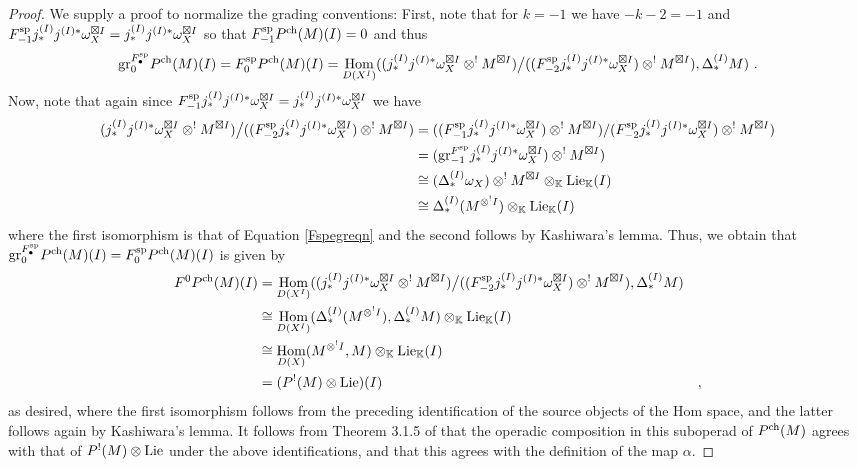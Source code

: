 \documentclass[11pt]{amsart}
\numberwithin{equation}{section}
\theoremstyle{definition}
\newcommand{\bb}{\mathbb}
\newcommand{\spe}{{\textup{sp}}}
\DeclareMathOperator{\Hom}{Hom}
\newcommand{\K}{{\bb K}}
\newcommand{\Lie}{{\textup{Lie}}}
\newcommand{\ch}{{\textup{ch}}}
\newcommand{\0}{{\textbf{0}}}
\newcommand{\DD}{{D}}
\newcommand{\gr}{\textup{gr}}
\def\ch{{\rm ch}}
\begin{document}
\begin{proof}We supply a proof to normalize the grading conventions: First, note that for $k=-1$ we have $-k-2=-1$ and $F_{-1}^\spe j^{(I)}_*j^{(I)*}\omega_{X}^{\boxtimes I} =j^{(I)}_*j^{(I)*}\omega_{X}^{\boxtimes I}$ so that $F_{-1}^\spe P^\ch(M)(I) =0$ and thus
\[	\gr_0^{F_\bullet^\spe}P^\ch(M)(I) = F_0^\spe P^\ch(M)(I) =\Hom_{\DD(X^I)}((j^{(I)}_*j^{(I)*}\omega_{X}^{\boxtimes I}\otimes^! M^{\boxtimes I} )\big/ ((F_{-2}^\spe j^{(I)}_*j^{(I)*}\omega_{X}^{\boxtimes I}) \otimes^! M^{\boxtimes I}), \Delta^{(I)}_*M ) \ . \]
Now, note that again since $F_{-1}^\spe j^{(I)}_*j^{(I)*}\omega_{X}^{\boxtimes I} =j^{(I)}_*j^{(I)*}\omega_{X}^{\boxtimes I}$ we have
\begin{align*}
	 (j^{(I)}_*j^{(I)*}\omega_{X}^{\boxtimes I}\otimes^! M^{\boxtimes I} )\big/ ((F_{-2}^\spe j^{(I)}_*j^{(I)*}\omega_{X}^{\boxtimes I}) \otimes^! M^{\boxtimes I})  & = ((F_{-1}^\spe j^{(I)}_*j^{(I)*}\omega_{X}^{\boxtimes I}) \otimes^! M^{\boxtimes I})/(F_{-2}^\spe j^{(I)}_*j^{(I)*}\omega_{X}^{\boxtimes I}) \otimes^! M^{\boxtimes I})  \\
	 & = (\gr_{-1}^{F^\spe}j^{(I)}_*j^{(I)*}\omega_{X}^{\boxtimes I}) \otimes^! M^{\boxtimes I}) \\
	 &  \cong (\Delta_*^{(I)} \omega_X)\otimes^! M^{\boxtimes I}  \otimes_{ \K} \Lie_\K(I) \\
	 & \cong \Delta_*^{(I)}  (M^{\otimes^! I})\otimes_{ \K} \Lie_\K(I)
\end{align*} where the first isomorphism is that of Equation \ref{Fspegreqn} and the second follows by Kashiwara's lemma. Thus, we obtain that $\gr_0^{F_\bullet^\spe}P^\ch(M)(I) = F_0^\spe P^\ch(M)(I)$ is given by
\begin{align*}
	 F^0P^\ch(M)(I) & =\Hom_{\DD(X^I)}((j^{(I)}_*j^{(I)*}\omega_{X}^{\boxtimes I}\otimes^! M^{\boxtimes I} )\big/ ((F_{-2}^\spe j^{(I)}_*j^{(I)*}\omega_{X}^{\boxtimes I}) \otimes^! M^{\boxtimes I}), \Delta^{(I)}_*M )  \\
	 & \cong \Hom_{\DD(X^I)}( \Delta_*^{(I)}  (M^{\otimes^! I}), \Delta^{(I)}_*M )\otimes_{ \K} \Lie_\K(I) \\
	 & \cong \Hom_{\DD(X)}(M^{\otimes^! I},M)\otimes_{ \K} \Lie_\K(I) \\
	& = (P^!(M)\otimes \Lie)(I) & ,
\end{align*}
as desired, where the first isomorphism follows from the preceding identification of the source objects of the Hom space, and the latter follows again by Kashiwara's lemma. It follows from Theorem 3.1.5 of \cite{BD1} that the operadic composition in this suboperad of $P^\ch(M)$ agrees with that of $P^!(M)\otimes \Lie$ under the above identifications, and that this agrees with the definition of the map $\alpha$.


\end{proof}
\end{document}
